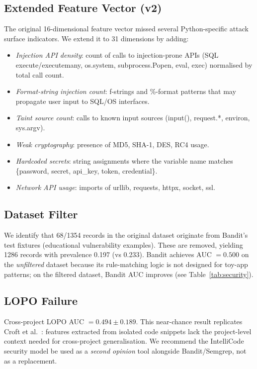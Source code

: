 \documentclass[conference]{IEEEtran}
\begin{document}
\subsection{Extended Feature Vector (v2)}
The original 16-dimensional feature vector missed several Python-specific
attack surface indicators.
We extend it to 31 dimensions by adding:
\begin{itemize}
  \item \emph{Injection API density}: count of calls to injection-prone APIs
    (SQL execute/executemany, os.system, subprocess.Popen, eval, exec)
    normalised by total call count.
  \item \emph{Format-string injection count}: f-strings and \%-format patterns
    that may propagate user input to SQL/OS interfaces.
  \item \emph{Taint source count}: calls to known input sources
    (input(), request.*, environ, sys.argv).
  \item \emph{Weak cryptography}: presence of MD5, SHA-1, DES, RC4 usage.
  \item \emph{Hardcoded secrets}: string assignments where the variable name
    matches \{password, secret, api\_key, token, credential\}.
  \item \emph{Network API usage}: imports of urllib, requests, httpx, socket, ssl.
\end{itemize}

\subsection{Dataset Filter}
We identify that 68/1354 records in the original dataset originate from
Bandit's test fixtures (educational vulnerability examples).
These are removed, yielding 1286 records with prevalence 0.197 (vs 0.233).
Bandit achieves AUC $= 0.500$ on the \emph{unfiltered} dataset because
its rule-matching logic is not designed for toy-app patterns;
on the filtered dataset, Bandit AUC improves (see Table~\ref{tab:security}).

\subsection{LOPO Failure}
Cross-project LOPO AUC $= 0.494 \pm 0.189$.
This near-chance result replicates Croft et al.~\cite{croft2023}:
features extracted from isolated code snippets lack the project-level
context needed for cross-project generalisation.
We recommend the IntelliCode security model be used as a \emph{second opinion}
tool alongside Bandit/Semgrep, not as a replacement.
\end{document}
